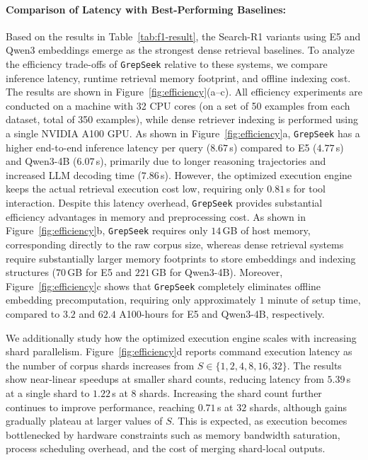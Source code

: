 \documentclass{article} %
\newcommand{\ourmethod}{\texttt{GrepSeek}\xspace}
\begin{document}
\paragraph{Comparison of Latency with Best-Performing Baselines:}

Based on the results in Table~\ref{tab:f1-result}, the Search-R1 variants using E5 and Qwen3 embeddings emerge as the strongest dense retrieval baselines. To analyze the efficiency trade-offs of \ourmethod{} relative to these systems, we compare inference latency, runtime retrieval memory footprint, and offline indexing cost. The results are shown in Figure~\ref{fig:efficiency}(a--c). All efficiency experiments are conducted on a machine with 32 CPU cores (on a set of 50 examples from each dataset, total of 350 examples), while dense retriever indexing is performed using a single NVIDIA A100 GPU. As shown in Figure~\ref{fig:efficiency}a, \ourmethod{} has a higher end-to-end inference latency per query ($8.67$\,s) compared to E5 ($4.77$\,s) and Qwen3-4B ($6.07$\,s), primarily due to longer reasoning trajectories and increased LLM decoding time ($7.86$\,s). However, the optimized execution engine keeps the actual retrieval execution cost low, requiring only $0.81$\,s for tool interaction. Despite this latency overhead, \ourmethod{} provides substantial efficiency advantages in memory and preprocessing cost. As shown in Figure~\ref{fig:efficiency}b, \ourmethod{} requires only $14$\,GB of host memory, corresponding directly to the raw corpus size, whereas dense retrieval systems require substantially larger memory footprints to store embeddings and indexing structures ($70$\,GB for E5 and $221$\,GB for Qwen3-4B). Moreover, Figure~\ref{fig:efficiency}c shows that \ourmethod{} completely eliminates offline embedding precomputation, requiring only approximately $1$ minute of setup time, compared to $3.2$ and $62.4$ A100-hours for E5 and Qwen3-4B, respectively.



We additionally study how the optimized execution engine scales with increasing shard parallelism. Figure~\ref{fig:efficiency}d reports command execution latency as the number of corpus shards increases from $S \in \{1,2,4,8,16,32\}$. The results show near-linear speedups at smaller shard counts, reducing latency from $5.39$\,s at a single shard to $1.22$\,s at $8$ shards. Increasing the shard count further continues to improve performance, reaching $0.71$\,s at $32$ shards, although gains gradually plateau at larger values of $S$. This is expected, as execution becomes bottlenecked by hardware constraints such as memory bandwidth saturation, process scheduling overhead, and the cost of merging shard-local outputs.
\end{document}
